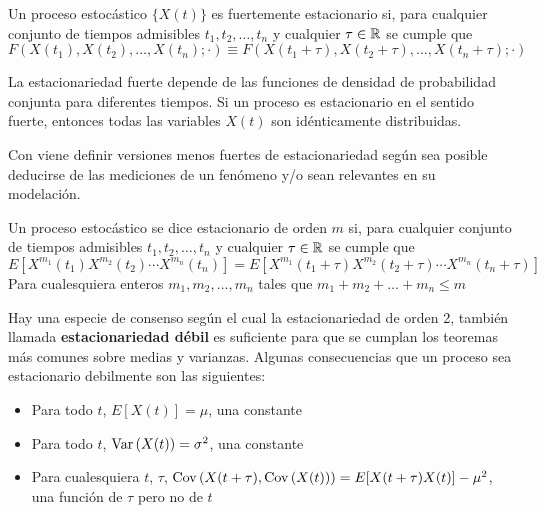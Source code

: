\begin{defn}
Un proceso estoc\'astico $\{ X(t) \}$ es fuertemente estacionario si, para cualquier 
conjunto de tiempos admisibles $t_1,t_2,\dots,t_n$ y cualquier $\tau \in \mathbb{R}$
se cumple que
\begin{equation*}
F\left(X(t_1),X(t_2),\dots,X(t_n);\cdot\right) 
\equiv
F\left(X(t_1+\tau),X(t_2+\tau),\dots,X(t_n+\tau);\cdot\right)
\end{equation*}
\end{defn}

La estacionariedad fuerte depende de las funciones de densidad de probabilidad conjunta para
diferentes tiempos. 
Si un proceso es estacionario en el sentido fuerte, entonces todas las variables $X(t)$ son 
id\'enticamente distribuidas.


Con viene definir versiones menos fuertes de estacionariedad seg\'un sea posible deducirse de
las mediciones de un fen\'omeno y/o sean relevantes en su modelaci\'on.

\begin{defn}
Un proceso estoc\'astico se dice estacionario de orden $m$ si, para cualquier 
conjunto de tiempos admisibles $t_1,t_2,\dots,t_n$ y cualquier $\tau \in \mathbb{R}$
se cumple que
\begin{equation*}
E\left[ X^{m_1}(t_1)X^{m_2}(t_2)\cdots X^{m_n}(t_n) \right]
=
E\left[ X^{m_1}(t_1+\tau)X^{m_2}(t_2+\tau)\cdots X^{m_n}(t_n+\tau) \right]
\end{equation*}
Para cualesquiera enteros $m_1,m_2,\dots,m_n$ tales que $m_1+m_2+\dots+m_n \leq m$
\end{defn}

Hay una especie de consenso seg\'un el cual la estacionariedad de orden 2, tambi\'en
llamada \textbf{estacionariedad d\'ebil} es suficiente para
que se cumplan los teoremas m\'as comunes sobre medias y varianzas.
Algunas consecuencias que un
proceso sea estacionario debilmente son las siguientes:
\begin{itemize}
\item Para todo $t$, $E[X(t)] = \mu$, una constante
\item Para todo $t$, $\mathrm{Var}\left( X(t) \right) = \sigma^{2}$, una constante
\item Para cualesquiera $t$, $\tau$, $\mathrm{Cov}\left( X(t+\tau),\mathrm{Cov}\left( X(t) \right) \right) = E[X(t+\tau)X(t)] - \mu^{2}$, 
una funci\'on de $\tau$ pero no de $t$
\end{itemize}

